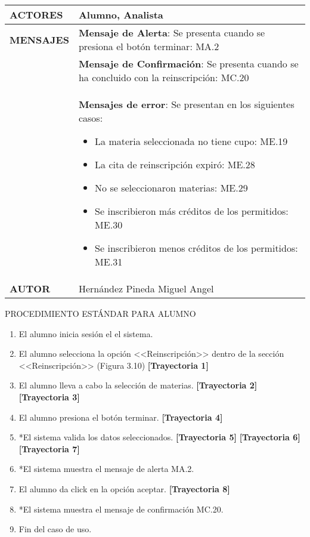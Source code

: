 \begin{longtable}{ | p{6cm} | p{10cm} |}
\hline
\textbf{ACTORES} & Alumno, Analista\\
\hline
\textbf{MENSAJES} & \textbf{Mensaje de Alerta}: Se presenta cuando se presiona el botón terminar: MA.2\\ & \textbf{Mensaje de Confirmación}: Se presenta cuando se ha concluido con la reinscripción: MC.20\\ & \textbf{Mensajes de error}: Se presentan en los siguientes casos:\begin{itemize}
    \item La materia seleccionada no tiene cupo: ME.19
    \item La cita de reinscripción expiró: ME.28
    \item No se seleccionaron materias: ME.29
    \item Se inscribieron más créditos de los permitidos: ME.30
    \item Se inscribieron menos créditos de los permitidos: ME.31
\end{itemize}\\
\hline
\textbf{AUTOR} & Hernández Pineda Miguel Angel\\
\hline
\end{longtable}
\vspace*{1cm}
\noindent
\Large{PROCEDIMIENTO ESTÁNDAR PARA ALUMNO}
\large{}
\begin{enumerate}
    \item El alumno inicia sesión el el sistema.
    \item El alumno selecciona la opción <<Reinscripción>> dentro de la sección <<Reinscripción>> (Figura 3.10) \textbf{[Trayectoria 1]}
    \item El alumno lleva a cabo la selección de materias. \textbf{[Trayectoria 2]} \textbf{[Trayectoria 3]}
    \item El alumno presiona el botón terminar. \textbf{[Trayectoria 4]}
    \item *El sistema valida los datos seleccionados. \textbf{[Trayectoria 5]} \textbf{[Trayectoria 6]} \textbf{[Trayectoria 7]}
    \item *El sistema muestra el mensaje de alerta MA.2.
    \item El alumno da click en la opción aceptar. \textbf{[Trayectoria 8]}
    \item *El sistema muestra el mensaje de confirmación MC.20.
    \item Fin del caso de uso.
\end{enumerate}
\vspace*{1cm}
